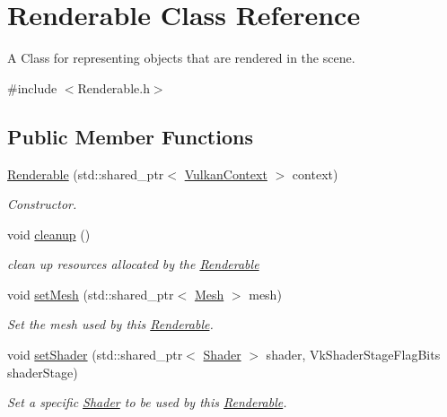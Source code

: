 \hypertarget{class_renderable}{}\section{Renderable Class Reference}
\label{class_renderable}


A Class for representing objects that are rendered in the scene.  




{\ttfamily \#include $<$Renderable.\+h$>$}

\subsection*{Public Member Functions}
\begin{DoxyCompactItemize}
\item 
\mbox{\hyperlink{class_renderable_a213b8f43e89f788eb08dc3862bfe83d1}{Renderable}} (std\+::shared\+\_\+ptr$<$ \mbox{\hyperlink{class_vulkan_context}{Vulkan\+Context}} $>$ context)
\begin{DoxyCompactList}\small\item\em Constructor. \end{DoxyCompactList}\item 
\mbox{\label{class_renderable_a83b3ad1866b05277a167842c74e6e26d}} 
void \mbox{\hyperlink{class_renderable_a83b3ad1866b05277a167842c74e6e26d}{cleanup}} ()
\begin{DoxyCompactList}\small\item\em clean up resources allocated by the \mbox{\hyperlink{class_renderable}{Renderable}} \end{DoxyCompactList}\item 
void \mbox{\hyperlink{class_renderable_a22514bc720361a64a3aa90239725f87d}{set\+Mesh}} (std\+::shared\+\_\+ptr$<$ \mbox{\hyperlink{class_mesh}{Mesh}} $>$ mesh)
\begin{DoxyCompactList}\small\item\em Set the mesh used by this \mbox{\hyperlink{class_renderable}{Renderable}}. \end{DoxyCompactList}\item 
void \mbox{\hyperlink{class_renderable_a60e28e983a2bd612ea97af28c461e03f}{set\+Shader}} (std\+::shared\+\_\+ptr$<$ \mbox{\hyperlink{class_shader}{Shader}} $>$ shader, Vk\+Shader\+Stage\+Flag\+Bits shader\+Stage)
\begin{DoxyCompactList}\small\item\em Set a specific \mbox{\hyperlink{class_shader}{Shader}} to be used by this \mbox{\hyperlink{class_renderable}{Renderable}}. \end{DoxyCompactList}\item 

\end{DoxyCompactItemize}
